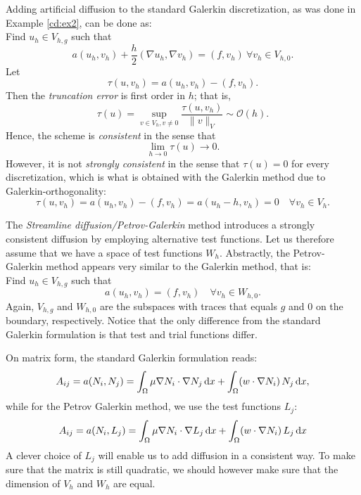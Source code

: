 Adding artificial diffusion 
to the standard Galerkin discretization, 
as was done in Example \ref{cd:ex2}, 
can be done as: \\ 
Find $u_h\in V_{h,g}$ such that 
\[
a(u_h, v_h) + \frac{h}{2}(\nabla u_h, \nabla v_h)  = (f,v_h)\ \forall v_h\in V_{h,0}.
\]
Let
\[
\tau(u, v_h) =  a(u_h, v_h) - (f,v_h). 
\]
Then the \emph{truncation error} is first order in $h$; that is, 
\[
\tau(u) = \sup_{v \in V_h, v \not = 0} \frac{\tau (u, v_h)}{\|v\|_{V}} \sim \mathcal{O}(h). 
\]
Hence, the scheme is \emph{consistent} in the sense that 
\[
\lim_{h\rightarrow 0} \tau (u) \rightarrow 0 .  
\]
However, it is not \emph{strongly consistent} in the sense that $\tau(u) = 0$ for every
discretization, which is what is obtained with the Galerkin method due
to Galerkin-orthogonality:   
\[
\tau(u, v_h) =  a(u_h, v_h) - (f,v_h) = a(u_h - h, v_h) = 0 \quad \forall v_h \in V_h. 
\]


The \textit{Streamline diffusion/Petrov-Galerkin} method introduces a strongly consistent  
diffusion by employing alternative test functions. Let us therefore
assume that we have a space of test functions $W_h$.   
Abstractly, the Petrov-Galerkin method appears very similar to the Galerkin method, that is: \\ 
Find $u_h\in V_{h,g}$ such that 
\[
a(u_h, v_h) = (f,v_h) \quad \forall v_h\in W_{h,0}.
\]
Again, $V_{h,g}$  and $W_{h,0}$ are the subspaces with traces that equals $g$ and $0$ on 
the boundary, respectively.  
Notice that the only difference from the standard Galerkin formulation is that test and trial functions differ. 

On matrix form, the standard Galerkin formulation reads: 
\begin{equation}
	A_{ij} = a(N_i, N_j ) = \int_\Omega\mu\nabla N_i \cdot \nabla N_j \, \mathrm{d}x + \int_\Omega (w \cdot \nabla N_i) \, N_j \, \mathrm{d}x, 
\label{eq:wGalerkin_A}
\end{equation}
while for the Petrov Galerkin method, we use the test functions $L_j$: 
\[A_{ij} = a(N_i, L_j ) = \int_\Omega\mu\nabla N_i \cdot \nabla L_j \, \mathrm{d}x + \int_\Omega (w \cdot \nabla N_i) \, L_j \, \mathrm{d}x\]
A clever choice of $L_j$ will enable us to add diffusion in a consistent way. To make sure
that the matrix is still quadratic, we should however make sure that the dimension of 
$V_h$ and $W_h$ are equal. 

